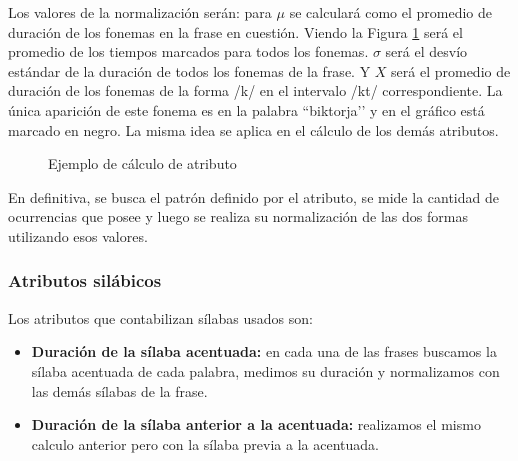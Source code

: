 Los valores de la normalización serán: para $\mu$ se calculará como el promedio de duración de los fonemas en la frase en cuestión. Viendo la Figura \ref{ejemploAtribFon} será el promedio de los tiempos marcados para todos los fonemas. $\sigma$ será el desvío estándar de la duración de todos los fonemas de la frase. Y $X$ será el promedio de duración de los fonemas de la forma /k/ en el intervalo /kt/ correspondiente. La única aparición de este fonema es en la palabra ``biktorja’’ y en el gráfico está marcado en negro. La misma idea se aplica en el cálculo de los demás atributos.

\begin{figure}[H]
\centering
{}
\caption{Ejemplo de cálculo de atributo}
\label{ejemploAtribFon}
\end{figure}

En definitiva, se busca el patrón definido por el atributo, se mide la cantidad de ocurrencias que posee y luego se realiza su normalización de las dos formas utilizando esos valores. 

\subsubsection{Atributos silábicos}

Los atributos que contabilizan sílabas usados son:

\begin{itemize}
    \item \textbf{Duración de la sílaba acentuada:} en cada una de las frases buscamos la sílaba acentuada de cada palabra, medimos su duración y normalizamos con las demás sílabas de la frase.
    \item \textbf{Duración de la sílaba anterior a la acentuada:} realizamos el mismo calculo anterior pero con la sílaba previa a la acentuada. 
\end{itemize}

